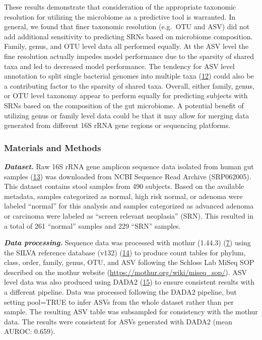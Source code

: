 \documentclass[
]{article}
\begin{document}
These results demonstrate that consideration of the appropriate
taxonomic resolution for utilizing the microbiome as a predictive tool
is warranted. In general, we found that finer taxonomic resolution
(e.g.~OTU and ASV) did not add additional sensitivity to predicting SRNs
based on microbiome composition. Family, genus, and OTU level data all
performed equally. At the ASV level the fine resolution actually impedes
model performance due to the sparsity of shared taxa and led to
decreased model performance. The tendency for ASV level annotation to
split single bacterial genomes into multiple taxa
(\protect\hyperlink{ref-schloss}{12}) could also be a contributing
factor to the sparsity of shared taxa. Overall, either family, genus, or
OTU level taxonomy appear to perform equally for predicting subjects
with SRNs based on the composition of the gut microbiome. A potential
benefit of utilizing genus or family level data could be that it may
allow for merging data generated from different 16S rRNA gene regions or
sequencing platforms.

\hypertarget{materials-and-methods}{%
\subsubsection{Materials and Methods}\label{materials-and-methods}}

\textbf{\emph{Dataset.}} Raw 16S rRNA gene amplicon sequence data
isolated from human gut samples (\protect\hyperlink{ref-baxter2016}{13})
was downloaded from NCBI Sequence Read Archive (SRP062005). This dataset
contains stool samples from 490 subjects. Based on the available
metadata, samples categorized as normal, high risk normal, or adenoma
were labeled ``normal'' for this analysis and samples categorized as
advanced adenoma or carcinoma were labeled as ``screen relevant
neoplasia'' (SRN). This resulted in a total of 261 ``normal'' samples
and 229 ``SRN'' samples.

\textbf{\emph{Data processing.}} Sequence data was processed with mothur
(1.44.3) (\protect\hyperlink{ref-schloss2009}{7}) using the SILVA
reference database (v132) (\protect\hyperlink{ref-quast2013}{14}) to
produce count tables for phylum, class, order, family, genus, OTU, and
ASV following the Schloss Lab MiSeq SOP described on the mothur website
(\url{https://mothur.org/wiki/miseq_sop/}). ASV level data was also
produced using DADA2 (\protect\hyperlink{ref-callahan2016}{15}) to
ensure consistent results with a different pipeline. Data was processed
following the DADA2 pipeline, but setting pool=TRUE to infer ASVs from
the whole dataset rather than per sample. The resulting ASV table was
subsampled for consistency with the mothur data. The results were
consistent for ASVs generated with DADA2 (mean AUROC: 0.659).
\end{document}
